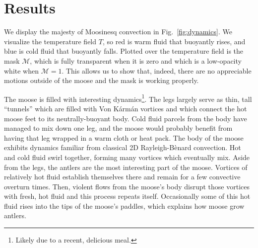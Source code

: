 \section{Results}
\label{sec:results}

We display the majesty of Moosinesq convection in Fig.~\ref{fig:dynamics}.
We visualize the temperature field $T$, so red is warm fluid that buoyantly rises, and blue is cold fluid that buoyantly falls.
Plotted over the temperature field is the mask $\mathcal{M}$, which is fully transparent when it is zero and which is a low-opacity white when $\mathcal{M} = 1$.
This allows us to show that, indeed, there are no appreciable motions outside of the moose and the mask is working properly.

The moose is filled with interesting dynamics\footnote{Likely due to a recent, delicious meal.}.
The legs largely serve as thin, tall ``tunnels'' which are filled with Von K\'{a}rm\'{a}n vortices and which connect the hot moose feet to its neutrally-buoyant body.
Cold fluid parcels from the body have managed to mix down one leg, and the moose would probably benefit from having that leg wrapped in a warm cloth or heat pack.
The body of the moose exhibits dynamics familiar from classical 2D Rayleigh-B\`{e}nard convection.
Hot and cold fluid swirl together, forming many vortices which eventually mix.
Aside from the legs, the antlers are the most interesting part of the moose.
Vortices of relatively hot fluid establish themselves there and remain for a few convective overturn times.
Then, violent flows from the moose's body disrupt those vortices with fresh, hot fluid and this process repeats itself.
Occasionally some of this hot fluid rises into the tips of the moose’s paddles, which explains how moose grow antlers.

